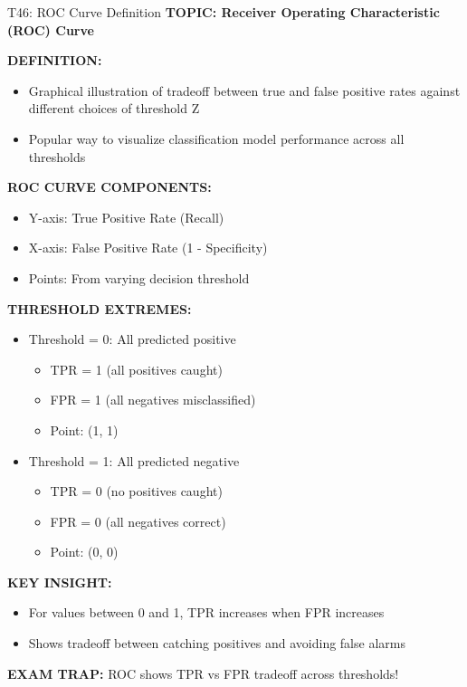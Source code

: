 \documentclass[8pt]{beamer}
\begin{document}
	\begin{frame}{T46: ROC Curve Definition}
		\fontsize{6.5}{7.5}\selectfont
		\textbf{TOPIC: Receiver Operating Characteristic (ROC) Curve}
		
		\vspace{0.1cm}
		\textbf{DEFINITION:}
		\begin{itemize}
			\item Graphical illustration of tradeoff between true and false positive rates against different choices of threshold Z
			\item Popular way to visualize classification model performance across all thresholds
		\end{itemize}
		
		\vspace{0.1cm}
		\textbf{ROC CURVE COMPONENTS:}
		\begin{itemize}
			\item \textcolor{myblue}{Y-axis:} True Positive Rate (Recall)
			\item \textcolor{myblue}{X-axis:} False Positive Rate (1 - Specificity)
			\item \textcolor{myblue}{Points:} From varying decision threshold
		\end{itemize}
		
		\vspace{0.1cm}
		\textbf{THRESHOLD EXTREMES:}
		\begin{itemize}
			\item \textcolor{myblue}{Threshold = 0:} All predicted positive
			\begin{itemize}
				\item TPR = 1 (all positives caught)
				\item FPR = 1 (all negatives misclassified)
				\item Point: (1, 1)
			\end{itemize}
			\item \textcolor{myblue}{Threshold = 1:} All predicted negative
			\begin{itemize}
				\item TPR = 0 (no positives caught)
				\item FPR = 0 (all negatives correct)
				\item Point: (0, 0)
			\end{itemize}
		\end{itemize}
		
		\vspace{0.1cm}
		\textbf{KEY INSIGHT:}
		\begin{itemize}
			\item For values between 0 and 1, TPR increases when FPR increases
			\item Shows tradeoff between catching positives and avoiding false alarms
		\end{itemize}
		
		\textcolor{myred}{\textbf{EXAM TRAP:}} ROC shows \textcolor{myblue}{TPR vs FPR} tradeoff across thresholds!
	\end{frame}
	
\end{document}
